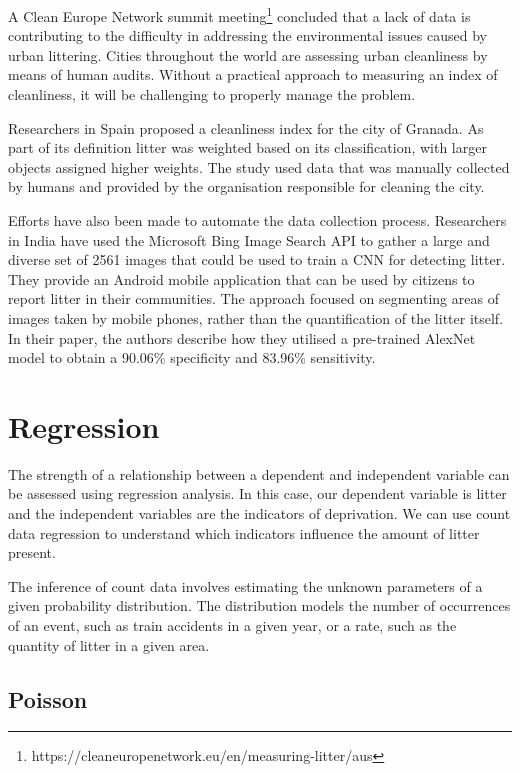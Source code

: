 \documentclass{thesis}
\begin{document}
A Clean Europe Network summit meeting\footnote{https://cleaneuropenetwork.eu/en/measuring-litter/aus} concluded that a lack of data is contributing to the difficulty in addressing the environmental issues caused by urban littering. Cities throughout the world are assessing urban cleanliness by means of human audits. Without a practical approach to measuring an index of cleanliness, it will be challenging to properly manage the problem. 

Researchers in Spain proposed a cleanliness index for the city of Granada\cite{sevilla}. As part of its definition litter was weighted based on its classification, with larger objects assigned higher weights. The study used data that was manually collected by humans and provided by the organisation responsible for cleaning the city.

Efforts have also been made to automate the data collection process. Researchers in India have used the Microsoft Bing Image Search API to gather a large and diverse set of 2561 images that could be used to train a CNN for detecting litter\cite{Mittal2016SpotGarbageSA}. They provide an Android mobile application that can be used by citizens to report litter in their communities. The approach focused on segmenting areas of images taken by mobile phones, rather than the quantification of the litter itself. In their paper, the authors describe how they utilised a pre-trained AlexNet\cite{NIPS2012_c399862d} model to obtain a 90.06\% specificity and 83.96\% sensitivity.

\section{Regression}

The strength of a relationship between a dependent and independent variable can be assessed using regression analysis. In this case, our dependent variable is litter and the independent variables are the indicators of deprivation. We can use count data regression to understand which indicators influence the amount of litter present.

The inference of count data involves estimating the unknown parameters of a given probability distribution. The distribution models the number of occurrences of an event, such as train accidents in a given year, or a rate, such as the quantity of litter in a given area.

\subsection{Poisson}
\end{document}
